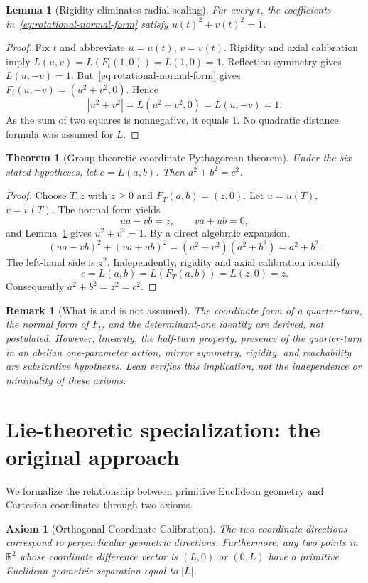 \documentclass[11pt,a4paper]{article}
\newtheorem{lemma}{Lemma}[section]
\newtheorem{theorem}{Theorem}[section]
\newtheorem{remark}{Remark}[section]
\newtheorem{axiom}{Axiom}[section]
\begin{document}
\begin{lemma}[Rigidity eliminates radial scaling]\label{lem:unit}
For every $t$, the coefficients in~\eqref{eq:rotational-normal-form}
satisfy $u(t)^2+v(t)^2=1$.
\end{lemma}
\begin{proof}
Fix $t$ and abbreviate $u=u(t)$, $v=v(t)$.
Rigidity and axial calibration imply
$L(u,v)=L(F_t(1,0))=L(1,0)=1$.
Reflection symmetry gives $L(u,-v)=1$.
But~\eqref{eq:rotational-normal-form} gives
$F_t(u,-v)=(u^2+v^2,0)$. Hence
\[
 |u^2+v^2|=L(u^2+v^2,0)=L(u,-v)=1.
\]
As the sum of two squares is nonnegative, it equals $1$.
No quadratic distance formula was assumed for $L$.
\end{proof}

\begin{theorem}[Group-theoretic coordinate Pythagorean theorem]
\label{thm:primary}
Under the six stated hypotheses, let $c=L(a,b)$.
Then $a^2+b^2=c^2$.
\end{theorem}
\begin{proof}
Choose $T,z$ with $z\geq0$ and $F_T(a,b)=(z,0)$.
Let $u=u(T)$, $v=v(T)$. The normal form yields
\[
 ua-vb=z,\qquad va+ub=0,
\]
and Lemma~\ref{lem:unit} gives $u^2+v^2=1$.
By a direct algebraic expansion,
\[
 (ua-vb)^2+(va+ub)^2
 =(u^2+v^2)(a^2+b^2)=a^2+b^2.
\]
The left-hand side is $z^2$. Independently,
rigidity and axial calibration identify
\[
 c=L(a,b)=L(F_T(a,b))=L(z,0)=z.
\]
Consequently $a^2+b^2=z^2=c^2$.
\end{proof}

\begin{remark}[What is and is not assumed]
The coordinate form of a quarter-turn, the normal form of
$F_t$, and the determinant-one identity are derived, not
postulated. However, linearity, the half-turn property,
presence of the quarter-turn in an abelian one-parameter
action, mirror symmetry, rigidity, and reachability are
substantive hypotheses. Lean verifies this implication,
not the independence or minimality of these axioms.
\end{remark}

\section{Lie-theoretic specialization: the original approach}
We formalize the relationship between primitive Euclidean geometry and Cartesian coordinates through two axioms.

\begin{axiom}[Orthogonal Coordinate Calibration]
The two coordinate directions correspond to perpendicular geometric directions. Furthermore, any two points in $\mathbb{R}^2$ whose coordinate difference vector is $(L,0)$ or $(0,L)$ have a primitive Euclidean geometric separation equal to $|L|$.
\end{axiom}
\end{document}
